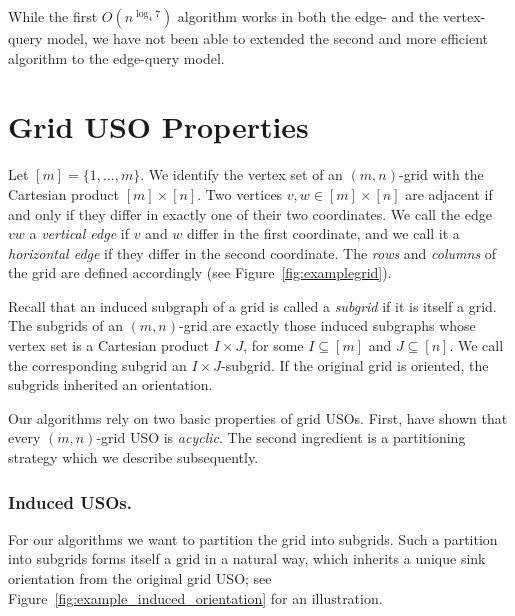 \documentclass[runningheads,a4paper]{llncs}
\newcommand{\JN}[1]{\marginpar{\parbox{3.6cm}{{\small {\bf JN:} #1}}}} %
\begin{document}
While the first $O(n^{\log_4 7})$ algorithm works in both the edge- and the vertex-query model, we have not been able to extended the second and more efficient algorithm to the edge-query model.


\section{Grid USO Properties}\label{section:grid_uso_properties}

Let $[m] = \{1,\ldots,m\}$.
We identify the vertex set of an $(m,n)$-grid with the Cartesian product $[m] \times [n]$. Two
vertices $v,w \in [m] \times [n]$ are adjacent if and only if they differ in
exactly one of their two coordinates.
We call the edge $vw$ a \emph{vertical edge} if $v$ and $w$ differ in the
first coordinate, and we call it a \emph{horizontal edge} if they differ in the
second coordinate. The \emph{rows} and \emph{columns} of the grid are defined accordingly (see Figure~\ref{fig:examplegrid}).


Recall that an induced subgraph of a grid is called a \emph{subgrid} if it is itself a grid.
The subgrids of an $(m,n)$-grid are exactly those induced subgraphs whose vertex set is a
Cartesian product $I \times J$, for some $I \subseteq [m]$ and $J \subseteq [n]$. We call the corresponding subgrid an $I\times J$-subgrid.
If the original grid is oriented, the subgrids inherited an orientation. 

Our algorithms rely on two basic properties of grid USOs.
First, \citet{grid08} have shown that every $(m,n)$-grid USO is \emph{acyclic}. 
The second ingredient is a partitioning strategy which we describe subsequently.

\subsubsection{Induced USOs.}

For our algorithms we want to partition the grid into subgrids.
Such a partition into subgrids forms itself a grid in a natural way,
which inherits a unique sink orientation from the original grid USO; see Figure~\ref{fig:example_induced_orientation} for an illustration.
\end{document}

